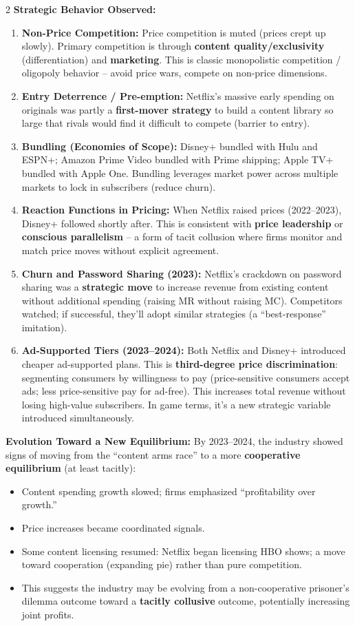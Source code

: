 \documentclass[10pt,a4paper]{article}
\begin{document}
\begin{multicols}{2}
\textbf{Strategic Behavior Observed:}
\begin{enumerate}[leftmargin=*,nosep]
    \item \textbf{Non-Price Competition:} Price competition is muted (prices crept up slowly). Primary competition is through \textbf{content quality/exclusivity} (differentiation) and \textbf{marketing}. This is classic monopolistic competition / oligopoly behavior -- avoid price wars, compete on non-price dimensions.
    \item \textbf{Entry Deterrence / Pre-emption:} Netflix's massive early spending on originals was partly a \textbf{first-mover strategy} to build a content library so large that rivals would find it difficult to compete (barrier to entry).
    \item \textbf{Bundling (Economies of Scope):} Disney+ bundled with Hulu and ESPN+; Amazon Prime Video bundled with Prime shipping; Apple TV+ bundled with Apple One. Bundling leverages market power across multiple markets to lock in subscribers (reduce churn).
    \item \textbf{Reaction Functions in Pricing:} When Netflix raised prices (2022--2023), Disney+ followed shortly after. This is consistent with \textbf{price leadership} or \textbf{conscious parallelism} -- a form of tacit collusion where firms monitor and match price moves without explicit agreement.
    \item \textbf{Churn and Password Sharing (2023):} Netflix's crackdown on password sharing was a \textbf{strategic move} to increase revenue from existing content without additional spending (raising MR without raising MC). Competitors watched; if successful, they'll adopt similar strategies (a ``best-response'' imitation).
    \item \textbf{Ad-Supported Tiers (2023--2024):} Both Netflix and Disney+ introduced cheaper ad-supported plans. This is \textbf{third-degree price discrimination}: segmenting consumers by willingness to pay (price-sensitive consumers accept ads; less price-sensitive pay for ad-free). This increases total revenue without losing high-value subscribers. In game terms, it's a new strategic variable introduced simultaneously.
\end{enumerate}

\textbf{Evolution Toward a New Equilibrium:}
By 2023--2024, the industry showed signs of moving from the ``content arms race'' to a more \textbf{cooperative equilibrium} (at least tacitly):
\begin{itemize}[leftmargin=*,nosep]
    \item Content spending growth slowed; firms emphasized ``profitability over growth.''
    \item Price increases became coordinated signals.
    \item Some content licensing resumed: Netflix began licensing HBO shows; a move toward cooperation (expanding pie) rather than pure competition.
    \item This suggests the industry may be evolving from a non-cooperative prisoner's dilemma outcome toward a \textbf{tacitly collusive} outcome, potentially increasing joint profits.
\end{itemize}


\end{multicols}
\end{document}
